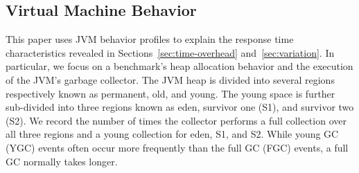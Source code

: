 \documentclass{sig-alternate}
\begin{document}




\subsection{Virtual Machine Behavior}
\label{sec:virt-mach-behav}


This paper uses JVM behavior profiles to explain the response time
characteristics revealed in Sections~\ref{sec:time-overhead}
and~\ref{sec:variation}.  In particular, we focus on a benchmark's
heap allocation behavior and the execution of the JVM's garbage
collector.  The JVM heap is divided into several regions respectively
known as permanent, old, and young.  The young space is further
sub-divided into three regions known as eden, survivor one (S1), and
survivor two (S2).  We record the number of times the collector
performs a full collection over all three regions and a young
collection for eden, S1, and S2.  While young GC (YGC) events often
occur more frequently than the full GC (FGC) events, a full GC
normally takes longer.


\end{document}
